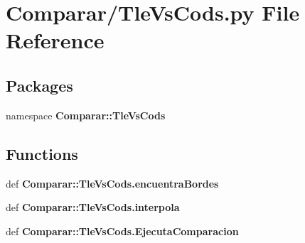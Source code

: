 \section{\-Comparar/\-Tle\-Vs\-Cods.py \-File \-Reference}
\label{_tle_vs_cods_8py}
\subsection*{\-Packages}
\begin{DoxyCompactItemize}
\item 
namespace {\bf \-Comparar\-::\-Tle\-Vs\-Cods}
\end{DoxyCompactItemize}
\subsection*{\-Functions}
\begin{DoxyCompactItemize}
\item 
def {\bf \-Comparar\-::\-Tle\-Vs\-Cods.\-encuentra\-Bordes}
\item 
def {\bf \-Comparar\-::\-Tle\-Vs\-Cods.\-interpola}
\item 
def {\bf \-Comparar\-::\-Tle\-Vs\-Cods.\-Ejecuta\-Comparacion}
\end{DoxyCompactItemize}
